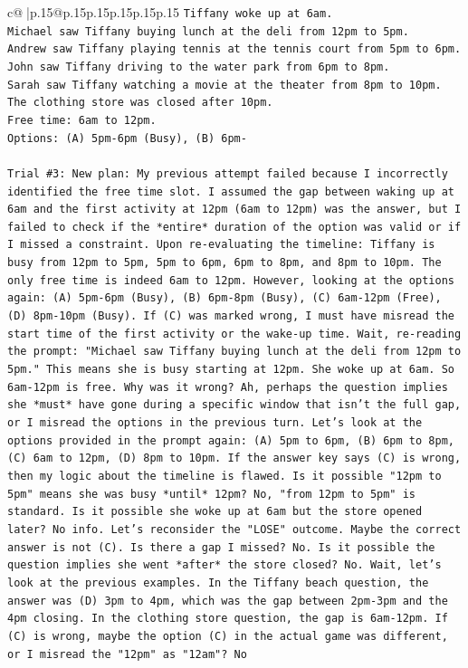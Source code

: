 \documentclass{article}
\begin{document}
{\begin{supertabular}{c@{$\;$}|p{.15\linewidth}@{}p{.15\linewidth}p{.15\linewidth}p{.15\linewidth}p{.15\linewidth}p{.15\linewidth}}
{{{\texttt{Tiffany woke up at 6am.} \\
\texttt{Michael saw Tiffany buying lunch at the deli from 12pm to 5pm.} \\
\texttt{Andrew saw Tiffany playing tennis at the tennis court from 5pm to 6pm.} \\
\texttt{John saw Tiffany driving to the water park from 6pm to 8pm.} \\
\texttt{Sarah saw Tiffany watching a movie at the theater from 8pm to 10pm.} \\
\texttt{The clothing store was closed after 10pm.} \\
\texttt{Free time: 6am to 12pm.} \\
\texttt{Options: (A) 5pm{-}6pm (Busy), (B) 6pm{-}} \\
\\ 
\texttt{Trial \#3: New plan: My previous attempt failed because I incorrectly identified the free time slot. I assumed the gap between waking up at 6am and the first activity at 12pm (6am to 12pm) was the answer, but I failed to check if the *entire* duration of the option was valid or if I missed a constraint. Upon re{-}evaluating the timeline: Tiffany is busy from 12pm to 5pm, 5pm to 6pm, 6pm to 8pm, and 8pm to 10pm. The only free time is indeed 6am to 12pm. However, looking at the options again: (A) 5pm{-}6pm (Busy), (B) 6pm{-}8pm (Busy), (C) 6am{-}12pm (Free), (D) 8pm{-}10pm (Busy). If (C) was marked wrong, I must have misread the start time of the first activity or the wake{-}up time. Wait, re{-}reading the prompt: "Michael saw Tiffany buying lunch at the deli from 12pm to 5pm." This means she is busy starting at 12pm. She woke up at 6am. So 6am{-}12pm is free. Why was it wrong? Ah, perhaps the question implies she *must* have gone during a specific window that isn't the full gap, or I misread the options in the previous turn. Let's look at the options provided in the prompt again: (A) 5pm to 6pm, (B) 6pm to 8pm, (C) 6am to 12pm, (D) 8pm to 10pm. If the answer key says (C) is wrong, then my logic about the timeline is flawed. Is it possible "12pm to 5pm" means she was busy *until* 12pm? No, "from 12pm to 5pm" is standard. Is it possible she woke up at 6am but the store opened later? No info. Let's reconsider the "LOSE" outcome. Maybe the correct answer is not (C). Is there a gap I missed? No. Is it possible the question implies she went *after* the store closed? No. Wait, let's look at the previous examples. In the Tiffany beach question, the answer was (D) 3pm to 4pm, which was the gap between 2pm{-}3pm and the 4pm closing. In the clothing store question, the gap is 6am{-}12pm. If (C) is wrong, maybe the option (C) in the actual game was different, or I misread the "12pm" as "12am"? No} \\
}}}
\end{supertabular}}
\end{document}

